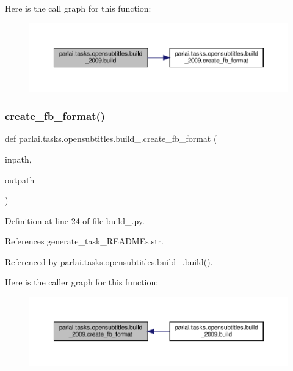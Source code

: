 Here is the call graph for this function\+:
\nopagebreak
\begin{figure}[H]
\begin{center}
\leavevmode
\includegraphics[width=350pt]{namespaceparlai_1_1tasks_1_1opensubtitles_1_1build__2009_a1b4aedcfe5cf20f4708277aba234e048_cgraph}
\end{center}
\end{figure}
\mbox{\label{namespaceparlai_1_1tasks_1_1opensubtitles_1_1build__2009_ad149abe80311061e9b055102702633ed}} 
\subsubsection{\texorpdfstring{create\+\_\+fb\+\_\+format()}{create\_fb\_format()}}
{\footnotesize\ttfamily def parlai.\+tasks.\+opensubtitles.\+build\+\_.\+create\+\_\+fb\+\_\+format (\begin{DoxyParamCaption}\item[{}]{inpath,  }\item[{}]{outpath }\end{DoxyParamCaption})}



Definition at line 24 of file build\+\_.\+py.



References generate\+\_\+task\+\_\+\+R\+E\+A\+D\+M\+Es.\+str.



Referenced by parlai.\+tasks.\+opensubtitles.\+build\+\_.\+build().

Here is the caller graph for this function\+:
\nopagebreak
\begin{figure}[H]
\begin{center}
\leavevmode
\includegraphics[width=350pt]{namespaceparlai_1_1tasks_1_1opensubtitles_1_1build__2009_ad149abe80311061e9b055102702633ed_icgraph}
\end{center}
\end{figure}

